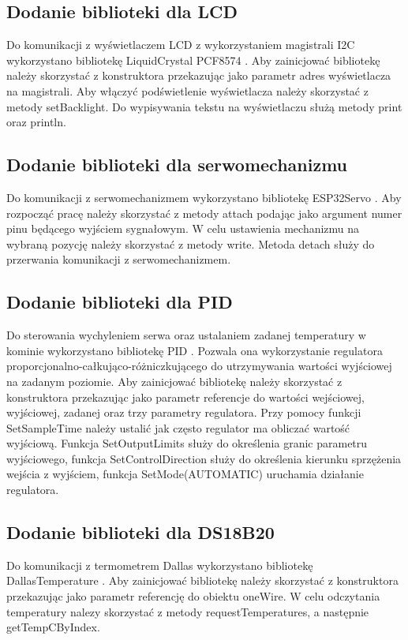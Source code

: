 \documentclass[11pt]{report}
\begin{document}
 \subsection{Dodanie biblioteki dla LCD}
 Do komunikacji z wyświetlaczem LCD z wykorzystaniem magistrali I2C wykorzystano bibliotekę LiquidCrystal PCF8574 \cite{LCDlibrary}. Aby zainicjować bibliotekę należy skorzystać z konstruktora przekazując jako parametr adres wyświetlacza na magistrali. Aby włączyć podświetlenie wyświetlacza należy skorzystać z metody setBacklight. Do wypisywania tekstu na wyświetlaczu służą metody print oraz println.
 \subsection{Dodanie biblioteki dla serwomechanizmu}
 Do komunikacji z serwomechanizmem wykorzystano bibliotekę ESP32Servo \cite{Servolibrary}. Aby rozpocząć pracę należy skorzystać z metody attach podając jako argument numer pinu będącego wyjściem sygnałowym. W celu ustawienia mechanizmu na wybraną pozycję należy skorzystać z metody write. Metoda detach służy do przerwania komunikacji z serwomechanizmem.
 \subsection{Dodanie biblioteki dla PID}
 Do sterowania wychyleniem serwa oraz ustalaniem zadanej temperatury w kominie wykorzystano bibliotekę PID \cite{PIDlibrary}. Pozwala ona wykorzystanie regulatora proporcjonalno-całkująco-różniczkującego do utrzymywania wartości wyjściowej na zadanym poziomie.
 Aby zainicjować bibliotekę  należy skorzystać z konstruktora przekazując jako parametr referencje do wartości wejściowej, wyjściowej, zadanej oraz trzy parametry regulatora. Przy pomocy funkcji SetSampleTime należy ustalić jak często regulator ma obliczać wartość wyjściową. Funkcja SetOutputLimits służy do określenia granic parametru wyjściowego, funkcja SetControlDirection służy do określenia kierunku sprzężenia wejścia z wyjściem, funkcja SetMode(AUTOMATIC) uruchamia działanie regulatora.
 \subsection{Dodanie biblioteki dla DS18B20}
 Do komunikacji z termometrem Dallas wykorzystano bibliotekę DallasTemperature \cite{dallaslibrary}. Aby zainicjować bibliotekę należy skorzystać z konstruktora przekazując jako parametr referencję do obiektu oneWire. W celu odczytania temperatury nalezy skorzystać z metody requestTemperatures, a następnie getTempCByIndex.
\end{document}
